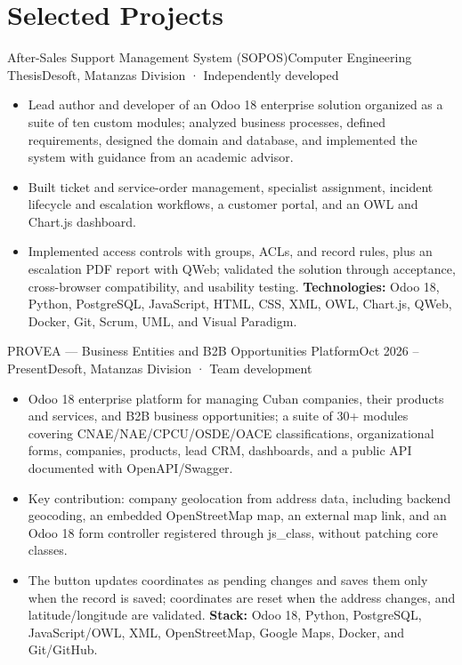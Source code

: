 \section{Selected Projects}

\begin{cvproject}{After-Sales Support Management System (SOPOS)}{Computer Engineering Thesis}{Desoft, Matanzas Division · Independently developed}
\begin{itemize}
  \item Lead author and developer of an Odoo 18 enterprise solution organized as a suite of ten custom modules; analyzed business processes, defined requirements, designed the domain and database, and implemented the system with guidance from an academic advisor.
  \item Built ticket and service-order management, specialist assignment, incident lifecycle and escalation workflows, a customer portal, and an OWL and Chart.js dashboard.
  \item Implemented access controls with groups, ACLs, and record rules, plus an escalation PDF report with QWeb; validated the solution through acceptance, cross-browser compatibility, and usability testing. \textbf{Technologies:} Odoo 18, Python, PostgreSQL, JavaScript, HTML, CSS, XML, OWL, Chart.js, QWeb, Docker, Git, Scrum, UML, and Visual Paradigm.
\end{itemize}
\end{cvproject}

\begin{cvproject}{PROVEA — Business Entities and B2B Opportunities Platform}{Oct 2026 – Present}{Desoft, Matanzas Division · Team development}
\begin{itemize}
  \item Odoo 18 enterprise platform for managing Cuban companies, their products and services, and B2B business opportunities; a suite of 30+ modules covering CNAE/NAE/CPCU/OSDE/OACE classifications, organizational forms, companies, products, lead CRM, dashboards, and a public API documented with \mbox{OpenAPI/Swagger}.
  \item Key contribution: company geolocation from address data, including backend geocoding, an embedded \mbox{OpenStreetMap} map, an external map link, and an Odoo 18 form controller registered through \mbox{js\_class}, without patching core classes.
  \item The button updates coordinates as pending changes and saves them only when the record is saved; coordinates are reset when the address changes, and latitude/longitude are validated. \textbf{Stack:} Odoo 18, Python, PostgreSQL, JavaScript/OWL, XML, \mbox{OpenStreetMap}, Google Maps, Docker, and \mbox{Git/GitHub}.
\end{itemize}
\end{cvproject}
